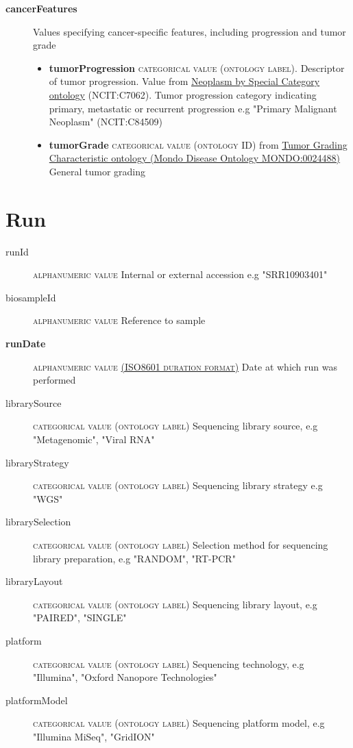 \documentclass[a4paper, 10pt]{article}        %
\begin{document}
\begin{description}
	\item[\textbf{cancerFeatures}] Values specifying cancer-specific features, including progression and tumor grade
	\begin{itemize}
			\item[] \textbf{tumorProgression} {\textsc{categorical value (ontology label)}}. Descriptor of tumor progression. Value from \href{https://www.ebi.ac.uk/ols/ontologies/ncit/terms?iri=http%3A%2F%2Fpurl.obolibrary.org%2Fobo%2FNCIT_C7062&viewMode=All&siblings=false}{Neoplasm by Special Category ontology} (NCIT:C7062). Tumor progression category indicating primary, metastatic or recurrent progression  e.g "Primary Malignant Neoplasm" (NCIT:C84509)
			\item[] \textbf{tumorGrade} {\textsc{categorical value (ontology ID)}} from \href{https://www.ebi.ac.uk/ols/ontologies/mondo/terms?iri=http%3A%2F%2Fpurl.obolibrary.org%2Fobo%2FMONDO_0024488}{Tumor Grading Characteristic ontology (Mondo Disease Ontology MONDO:0024488)} General tumor grading  	
\end{itemize} 
 \end{description}
 


   \section*{ {\color{teal} Run}}
  
  \begin{description}
	\item[runId] {\textsc{alphanumeric value}}  Internal or external accession e.g "SRR10903401"
	\item[biosampleId] {\textsc{alphanumeric value}}  Reference to sample 
	\item[\textbf{runDate}] {\textsc{alphanumeric value \href{https://www.iso.org/iso-8601-date-and-time-format.html}{(ISO8601 duration format)}}} Date at which run was performed	
	\item[librarySource] {\textsc{categorical value (ontology label)}}  Sequencing library source, e.g "Metagenomic", "Viral RNA"
	\item[libraryStrategy]  {\textsc{categorical value (ontology label)}} Sequencing library strategy e.g "WGS"
	\item[librarySelection] {\textsc{categorical value (ontology label)}} Selection method for sequencing library preparation, e.g "RANDOM", "RT-PCR"
	\item[libraryLayout] {\textsc{categorical value (ontology label)}}  Sequencing library layout, e.g "PAIRED", "SINGLE"
	\item[platform] {\textsc{categorical value (ontology label)}} Sequencing technology, e.g "Illumina", "Oxford Nanopore Technologies"
	\item[platformModel] {\textsc{categorical value (ontology label)}} Sequencing platform model, e.g "Illumina MiSeq", "GridION"
 \end{description}
 
\end{document}
